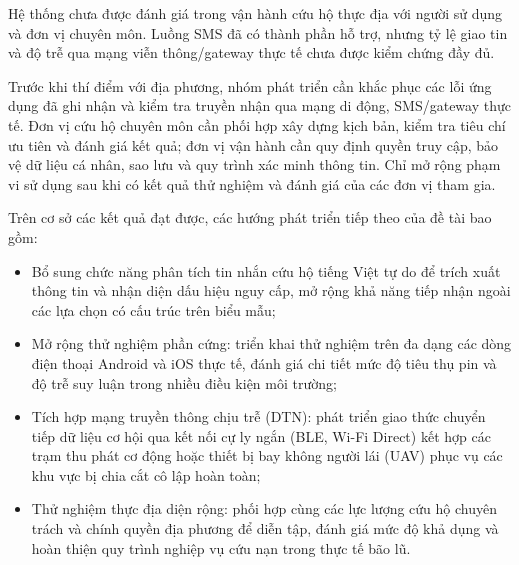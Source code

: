 Hệ thống chưa được đánh giá trong vận hành cứu hộ thực địa với người sử dụng và đơn vị chuyên môn. Luồng SMS đã có thành phần hỗ trợ, nhưng tỷ lệ giao tin và độ trễ qua mạng viễn thông/gateway thực tế chưa được kiểm chứng đầy đủ.

Trước khi thí điểm với địa phương, nhóm phát triển cần khắc phục các lỗi ứng dụng đã ghi nhận và kiểm tra truyền nhận qua mạng di động, SMS/gateway thực tế. Đơn vị cứu hộ chuyên môn cần phối hợp xây dựng kịch bản, kiểm tra tiêu chí ưu tiên và đánh giá kết quả; đơn vị vận hành cần quy định quyền truy cập, bảo vệ dữ liệu cá nhân, sao lưu và quy trình xác minh thông tin. Chỉ mở rộng phạm vi sử dụng sau khi có kết quả thử nghiệm và đánh giá của các đơn vị tham gia.

Trên cơ sở các kết quả đạt được, các hướng phát triển tiếp theo của đề tài bao gồm:
\begin{itemize}
\item Bổ sung chức năng phân tích tin nhắn cứu hộ tiếng Việt tự do để trích xuất thông tin và nhận diện dấu hiệu nguy cấp, mở rộng khả năng tiếp nhận ngoài các lựa chọn có cấu trúc trên biểu mẫu;
\item Mở rộng thử nghiệm phần cứng: triển khai thử nghiệm trên đa dạng các dòng điện thoại Android và iOS thực tế, đánh giá chi tiết mức độ tiêu thụ pin và độ trễ suy luận trong nhiều điều kiện môi trường;
\item Tích hợp mạng truyền thông chịu trễ (DTN): phát triển giao thức chuyển tiếp dữ liệu cơ hội qua kết nối cự ly ngắn (BLE, Wi-Fi Direct) kết hợp các trạm thu phát cơ động hoặc thiết bị bay không người lái (UAV) phục vụ các khu vực bị chia cắt cô lập hoàn toàn;
\item Thử nghiệm thực địa diện rộng: phối hợp cùng các lực lượng cứu hộ chuyên trách và chính quyền địa phương để diễn tập, đánh giá mức độ khả dụng và hoàn thiện quy trình nghiệp vụ cứu nạn trong thực tế bão lũ.
\end{itemize}

